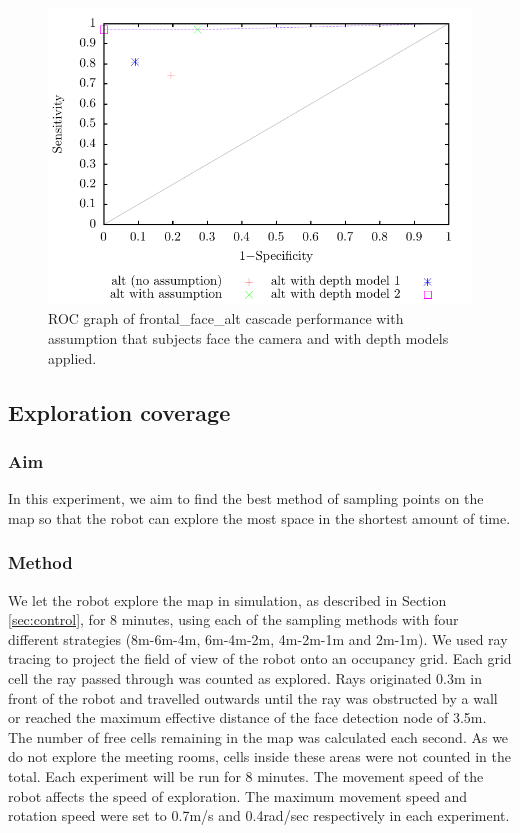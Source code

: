 \documentclass[conference]{IEEEtran}
\begin{document}
\begin{figure}
  \includegraphics[width=\columnwidth]{kinect_ROC}
  \caption{ROC graph of frontal\_face\_alt cascade performance with assumption that subjects face the camera and with depth models applied.}
  \label{fig:cascade_with_model}
\end{figure}
\subsection{Exploration coverage}
\subsubsection{Aim}
In this experiment, we aim to find the best method of sampling points on the map so that the robot can explore the most space in the shortest amount of time.
\subsubsection{Method}
We let the robot explore the map in simulation, as described in Section \ref{sec:control}, for 8 minutes, using each of the sampling methods with four different strategies (8m-6m-4m, 6m-4m-2m, 4m-2m-1m and 2m-1m). We used ray tracing to project the field of view of the robot onto an occupancy grid. Each grid cell the ray passed through was counted as explored. Rays originated 0.3m in front of the robot and travelled outwards until the ray was obstructed by a wall or reached the maximum effective distance of the face detection node of 3.5m. The number of free cells remaining in the map was calculated each second. As we do not explore the meeting rooms, cells inside these areas were not counted in the total. Each experiment will be run for 8 minutes. The movement speed of the robot affects the speed of exploration. The maximum movement speed and rotation speed were set to 0.7m/s and 0.4rad/sec respectively in each experiment.
\end{document}
